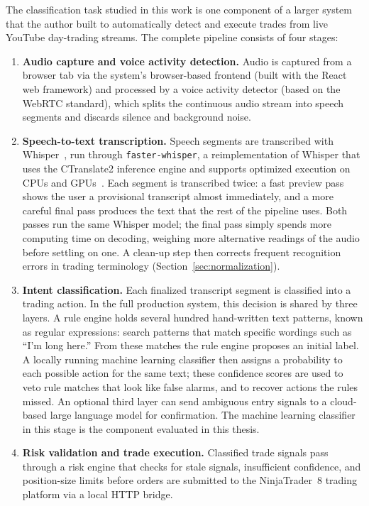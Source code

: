 The classification task studied in this work is one component of a larger system that the author built to automatically detect and execute trades from live YouTube day-trading streams. The complete pipeline consists of four stages:

\begin{enumerate}[label=\arabic*., leftmargin=2em]
\item \textbf{Audio capture and voice activity detection.} Audio is captured from a browser tab via the system's browser-based frontend (built with the React web framework) and processed by a voice activity detector (based on the WebRTC standard), which splits the continuous audio stream into speech segments and discards silence and background noise.

\item \textbf{Speech-to-text transcription.} Speech segments are transcribed with Whisper~\cite{radford2023whisper}, run through \texttt{faster-whisper}, a reimplementation of Whisper that uses the CTranslate2 inference engine and supports optimized execution on CPUs and GPUs~\cite{systran2023fasterwhisper}. Each segment is transcribed twice: a fast preview pass shows the user a provisional transcript almost immediately, and a more careful final pass produces the text that the rest of the pipeline uses. Both passes run the same Whisper model; the final pass simply spends more computing time on decoding, weighing more alternative readings of the audio before settling on one. A clean-up step then corrects frequent recognition errors in trading terminology (Section~\ref{sec:normalization}).

\item \textbf{Intent classification.} Each finalized transcript segment is classified into a trading action. In the full production system, this decision is shared by three layers. A rule engine holds several hundred hand-written text patterns, known as regular expressions: search patterns that match specific wordings such as ``I'm long here.'' From these matches the rule engine proposes an initial label. A locally running machine learning classifier then assigns a probability to each possible action for the same text; these confidence scores are used to veto rule matches that look like false alarms, and to recover actions the rules missed. An optional third layer can send ambiguous entry signals to a cloud-based large language model for confirmation. The machine learning classifier in this stage is the component evaluated in this thesis.

\item \textbf{Risk validation and trade execution.} Classified trade signals pass through a risk engine that checks for stale signals, insufficient confidence, and position-size limits before orders are submitted to the NinjaTrader~8 trading platform via a local HTTP bridge.
\end{enumerate}

